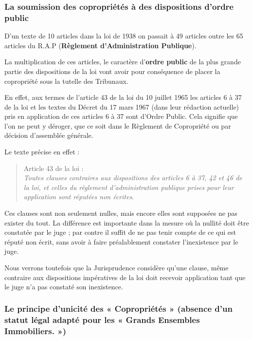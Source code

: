 		\subsubsection{La soumission des copropriétés à des dispositions d’ordre public}

			D'un texte de 10 articles dans la loi de 1938 on passait à 49 articles outre les 65 articles du R.A.P (\textbf{Règlement d'Administration Publique}).
			
			La multiplication de ces articles, le caractère d'\textbf{ordre public} de la plus grande partie des dispositions de la loi vont avoir pour conséquence de placer la copropriété sous la tutelle des Tribunaux.
			
			En effet, aux termes de l'article 43 de la loi du 10 juillet 1965 les articles 6 à 37 de la loi et les textes du Décret du 17 mars 1967 (dans leur rédaction actuelle) pris en application de ces articles 6 à 37 sont d'Ordre Public. Cela signifie que l'on ne peut y déroger, que ce soit dans le Règlement de Copropriété ou par décision d'assemblée générale.
			
			Le texte précise en effet :
			\begin{quote}
				Article 43 de la loi :\\
				\emph{Toutes clauses contraires aux dispositions des articles 6 à 37, 42 et 46 de la loi, et celles du règlement d'administration publique prises pour leur application sont réputées non écrites}.
			\end{quote}
		
			Ces clauses sont non seulement nulles, mais encore elles sont supposées ne pas exister du tout. La différence est importante dans la mesure où la nullité doit être constatée par le juge ; par contre il suffit de ne pas tenir compte de ce qui est réputé non écrit, sans avoir à faire préalablement constater l'inexistence par le juge.
			
			Nous verrons toutefois que la Jurisprudence considère qu’une clause, même contraire aux dispositions impératives de la loi doit recevoir application tant que le juge n’a pas constaté son inexistence.
		
		\subsubsection[Le principe d’unicité des « Copropriétés »]{Le principe d’unicité des « Copropriétés » (absence d’un statut légal adapté pour les « Grands Ensembles Immobiliers. »)}
		
